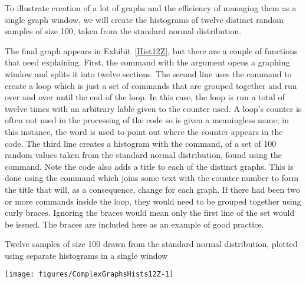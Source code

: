 To illustrate creation of a lot of graphs and the efficiency of managing them as a single graph window, we will create the histograms of twelve distinct random samples of size 100, taken from the standard normal distribution. 
 
The final graph appears in Exhibit~\ref{Hist12Z}, but there are a couple of functions that need explaining. First, the  command with the  argument opens a graphing window and splits it into twelve sections. The second line uses the  command to create a loop which is just a set of commands that are grouped together and run over and over until the end of the loop. In this case, the loop is run a total of twelve times with an arbitrary lable given to the counter used. A loop's counter is often not used in the processing of the code so is given a meaningless name; in this instance, the word  is used to point out where the counter appears in the code. The third line creates a histogram with the  command, of a set of 100 random values taken from the standard normal distribution, found using the  command. Note the code also adds a title to each of the distinct graphs. This is done using the  command which joins some text with the counter number to form the title that will, as a consequence, change for each graph. If there had been two or more commands inside the loop, they would need to be grouped together using curly braces. Ignoring the braces would mean only the first line of the set would be issued. The braces are included here as an example of good practice. 
 
\begin{exhibit} 
\begin{center} 
\caption{Twelve samples of size 100 drawn from the standard normal distribution, plotted using separate histograms in a single window} 
\label{Hists12Z} 
\begin{knitrout}
\color{fgcolor}\begin{kframe}
\begin{alltt}
\hlstd{> }\hlstd{(}\hlstd{=}\hlstd{(}\hlstd{,}\hlstd{))}
\hlstd{> }  \hlopt{:}\hlstd{)\{}
\hlstd{   }\hlstd{(}\hlstd{(}\hlstd{),} \hlstd{=}\hlstd{(}
\end{alltt}
\end{kframe}
\texttt{[image: figures/ComplexGraphsHists12Z-1]} 

\end{knitrout}
\end{center} 
\end{exhibit} 
 
